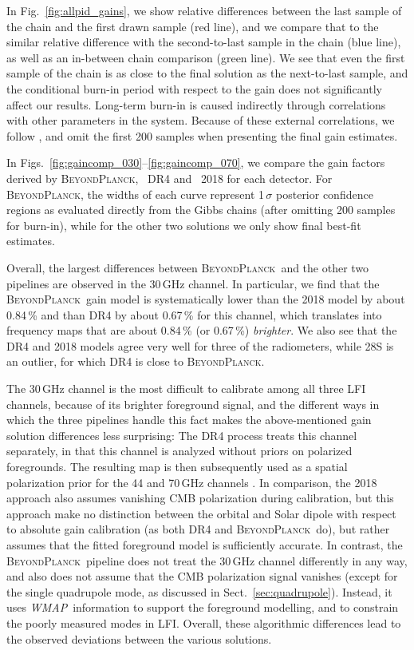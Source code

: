 \documentclass[twocolumn]{aa}
\def\WMAP{\textit{WMAP}}
\newcommand{\BP}{\textsc{BeyondPlanck}}
\begin{document}
In Fig.~\ref{fig:allpid_gains}, we show relative differences between
the last sample of the chain and the first drawn sample (red line),
and we compare that to the similar relative difference with the
second-to-last sample in the chain (blue line), as well as an
in-between chain comparison (green line). We see that even the first
sample of the chain is as close to the final solution as the
next-to-last sample, and the conditional burn-in period with respect
to the gain does not significantly affect our results. Long-term
burn-in is caused indirectly through correlations with other
parameters in the system. Because of these external correlations, we
follow \citet{bp01}, and omit the first 200 samples when presenting the
final gain estimates.

In Figs.~\ref{fig:gaincomp_030}--\ref{fig:gaincomp_070}, we compare
the gain factors derived by \BP, \Planck\ DR4 and \Planck\ 2018 for each
detector. For \BP, the widths of each curve represent 1\,$\sigma$
posterior confidence regions as evaluated directly from the Gibbs
chains (after omitting 200 samples for burn-in), while for the other
two solutions we only show final best-fit estimates.

Overall, the largest differences between \BP\ and the other two pipelines are
observed in the 30\,GHz channel. In particular, we find that the \BP\ gain
model is systematically lower than the 2018 model by about 0.84\,\% and than
DR4 by about 0.67\,\% for this channel, which translates into frequency maps
that are about 0.84\,\% (or 0.67\,\%) \emph{brighter}. We also see that the DR4
and 2018 models agree very well for three of the radiometers, while 28S is an
outlier, for which DR4 is close to \BP. 

The 30\,GHz channel is the most difficult to calibrate
among all three LFI channels, because of its brighter foreground
signal, and the different ways in which the three pipelines handle this fact makes the above-mentioned gain solution differences less surprising: The DR4 process treats this channel separately,
in that this channel is analyzed without priors on polarized foregrounds.
The resulting map is then subsequently used as a spatial
polarization prior for the 44 and 70\,GHz channels
\citep{planck2020-LVII}. In comparison, the 2018 approach also assumes
vanishing CMB polarization during calibration, but this approach make
no distinction between the orbital and Solar dipole with respect to
absolute gain calibration (as both DR4 and \BP\ do), but rather
assumes that the fitted foreground model is sufficiently accurate. In
contrast, the \BP\ pipeline does not treat the 30\,GHz channel
differently in any way, and also does not assume that the CMB
polarization signal vanishes (except for the single quadrupole mode,
as discussed in Sect.~\ref{sec:quadrupole}). Instead, it uses
\WMAP\ information to support the foreground modelling, and to
constrain the poorly measured modes in LFI. Overall, these
algorithmic differences lead to the observed deviations between the
various solutions.
\end{document}
